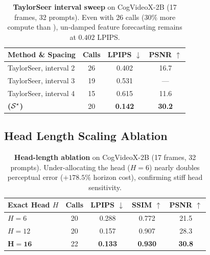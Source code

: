 \begin{table}[ht]
\centering\footnotesize\setlength{\tabcolsep}{4.5pt}
\begin{tabular}{lccc}
\toprule
Method \& Spacing & Calls & LPIPS $\downarrow$ & PSNR $\uparrow$ \\
\midrule
TaylorSeer, interval 2 & 26 & 0.402 & 16.7 \\
TaylorSeer, interval 3 & 19 & 0.531 & --- \\
TaylorSeer, interval 4 & 15 & 0.615 & 11.6 \\
\midrule
\textbf{\method{} ($\mathcal{S}^\star$)} & 20 & \textbf{0.142} & \textbf{30.2} \\
\bottomrule
\end{tabular}
\caption{\textbf{TaylorSeer interval sweep} on CogVideoX-2B (17 frames, 32 prompts). Even with 26 calls ($30\%$ more compute than \method{}), un-damped feature forecasting remains at $0.402$ LPIPS.}
\label{tab:taylor}
\end{table}

\subsection{Head Length Scaling Ablation}
\label{app:head}
\label{app:params}

\begin{table}[ht]
\centering\footnotesize\setlength{\tabcolsep}{5pt}
\begin{tabular}{lcccc}
\toprule
Exact Head $H$ & Calls & LPIPS $\downarrow$ & SSIM $\uparrow$ & PSNR $\uparrow$ \\
\midrule
$H = 6$  & 20 & 0.288 & 0.772 & 21.5 \\
$H = 12$ & 20 & 0.157 & 0.907 & 28.3 \\
$\mathbf{H = 16}$ & 22 & \textbf{0.133} & \textbf{0.930} & \textbf{30.8} \\
\bottomrule
\end{tabular}
\caption{\textbf{Head-length ablation} on CogVideoX-2B (17 frames, 32 prompts). Under-allocating the head ($H=6$) nearly doubles perceptual error ($+178.5\%$ horizon cost), confirming stiff head sensitivity.}
\label{tab:head}
\end{table}
